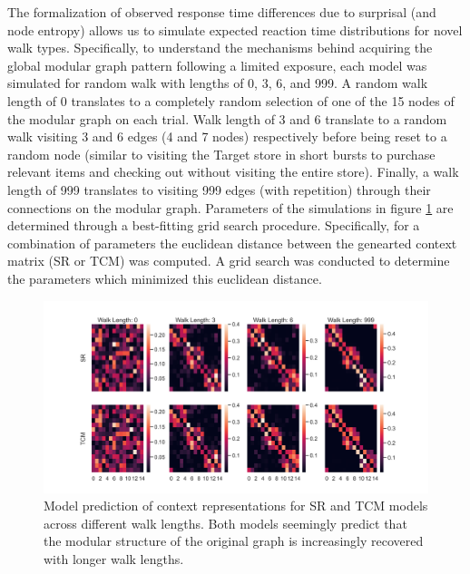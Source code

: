 The formalization of observed response time differences due to surprisal (and node entropy) allows us to simulate expected reaction time distributions for novel walk types. Specifically, to understand the mechanisms behind acquiring the global modular graph pattern following a limited exposure, each model was simulated for random walk with lengths of 0, 3, 6, and 999. A random walk length of 0 translates to a completely random selection of one of the 15 nodes of the modular graph on each trial. Walk length of 3 and 6 translate to a random walk visiting 3 and 6 edges (4 and 7 nodes) respectively before being reset to a random node (similar to visiting the Target store in short bursts to purchase relevant items and checking out without visiting the entire store). Finally, a walk length of 999 translates to visiting 999 edges (with repetition) through their connections on the modular graph. Parameters of the simulations in figure \ref{fig:SR-TCM-walklength-matrices} are determined through a best-fitting grid search procedure. Specifically, for a combination of parameters the euclidean distance between the genearted context matrix (SR or TCM) was computed. A grid search was conducted to determine the parameters which minimized this euclidean distance. 

\begin{figure}
	\centering
	\includegraphics[width = \textwidth]{chapter_notebooks/chapter_2/figures/walk_length_SR_TCM_matrices.png}
	\caption{Model prediction of context representations for SR and TCM models across different walk lengths. Both models seemingly predict that the modular structure of the original graph is increasingly recovered with longer walk lengths.}
	\label{fig:SR-TCM-walklength-matrices}
\end{figure}

